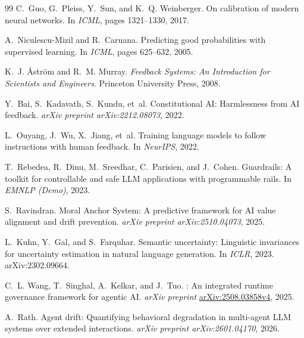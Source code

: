 \documentclass[11pt,twocolumn]{article}
\begin{document}
\begin{thebibliography}{99}
C.~Guo, G.~Pleiss, Y.~Sun, and K.~Q. Weinberger.
\newblock On calibration of modern neural networks.
\newblock In \emph{ICML}, pages 1321--1330, 2017.

A.~Niculescu-Mizil and R.~Caruana.
\newblock Predicting good probabilities with supervised learning.
\newblock In \emph{ICML}, pages 625--632, 2005.

K.~J. \AA{}str\"{o}m and R.~M. Murray.
\newblock \emph{Feedback Systems: An Introduction for Scientists and Engineers}.
\newblock Princeton University Press, 2008.

Y.~Bai, S.~Kadavath, S.~Kundu, et~al.
\newblock Constitutional {AI}: Harmlessness from {AI} feedback.
\newblock \emph{arXiv preprint arXiv:2212.08073}, 2022.

L.~Ouyang, J.~Wu, X.~Jiang, et~al.
\newblock Training language models to follow instructions with human feedback.
\newblock In \emph{NeurIPS}, 2022.

T.~Rebedea, R.~Dinu, M.~Sreedhar, C.~Parisien, and J.~Cohen.
 {G}uardrails: A toolkit for controllable and safe {LLM}
  applications with programmable rails.
\newblock In \emph{EMNLP (Demo)}, 2023.

S.~Ravindran.
\newblock Moral Anchor System: A predictive framework for {AI} value
  alignment and drift prevention.
\newblock \emph{arXiv preprint arXiv:2510.04073}, 2025.

L.~Kuhn, Y.~Gal, and S.~Farquhar.
\newblock Semantic uncertainty: Linguistic invariances for uncertainty
  estimation in natural language generation.
\newblock In \emph{ICLR}, 2023.
\newblock arXiv:2302.09664.

C.~L. Wang, T.~Singhal, A.~Kelkar, and J.~Tuo.
: An integrated runtime governance framework for agentic {AI}.
\newblock \emph{arXiv preprint} \href{https://arxiv.org/abs/2508.03858v4}{arXiv:2508.03858v4}, 2025.

A.~Rath.
\newblock Agent drift: Quantifying behavioral degradation in multi-agent {LLM}
  systems over extended interactions.
\newblock \emph{arXiv preprint arXiv:2601.04170}, 2026.


\end{thebibliography}
\end{document}
